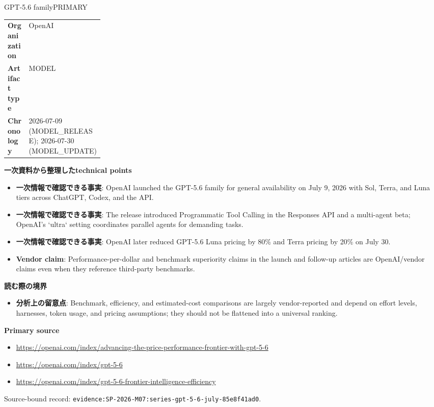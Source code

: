 \begin{technicalnote}{GPT-5.6 family}{PRIMARY}
\begin{tabularx}{\linewidth}{@{}>{\bfseries}p{0.22\linewidth}X@{}}
Organization & OpenAI \\
Artifact type & MODEL \\
Chronology & 2026-07-09 (MODEL\_RELEASE); 2026-07-30 (MODEL\_UPDATE) \\
\end{tabularx}
\smallskip
{\bfseries 一次資料から整理したtechnical points}
\begin{itemize}[leftmargin=1.5em,itemsep=0.35em]
\item \textbf{一次情報で確認できる事実}: OpenAI launched the GPT-5.6 family for general availability on July 9, 2026 with Sol, Terra, and Luna tiers across ChatGPT, Codex, and the API.
\item \textbf{一次情報で確認できる事実}: The release introduced Programmatic Tool Calling in the Responses API and a multi-agent beta; OpenAI's `ultra` setting coordinates parallel agents for demanding tasks.
\item \textbf{一次情報で確認できる事実}: OpenAI later reduced GPT-5.6 Luna pricing by 80\% and Terra pricing by 20\% on July 30.
\item \textbf{Vendor claim}: Performance-per-dollar and benchmark superiority claims in the launch and follow-up articles are OpenAI/vendor claims even when they reference third-party benchmarks.
\end{itemize}
{\bfseries 読む際の境界}
\begin{itemize}[leftmargin=1.5em,itemsep=0.35em]
\item \textbf{分析上の留意点}: Benchmark, efficiency, and estimated-cost comparisons are largely vendor-reported and depend on effort levels, harnesses, token usage, and pricing assumptions; they should not be flattened into a universal ranking.
\end{itemize}
{\bfseries Primary source}
\begin{itemize}[leftmargin=1.5em,itemsep=0.25em]
\item \url{https://openai.com/index/advancing-the-price-performance-frontier-with-gpt-5-6}
\item \url{https://openai.com/index/gpt-5-6}
\item \url{https://openai.com/index/gpt-5-6-frontier-intelligence-efficiency}
\end{itemize}
{\scriptsize\color{SurveyMuted}Source-bound record: \texttt{evidence:SP-2026-M07:series-gpt-5-6-july-85e8f41ad0}.}
\end{technicalnote}
\medskip

